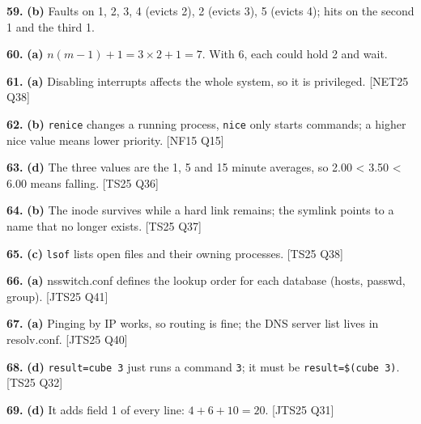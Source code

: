 \documentclass[11pt,a4paper]{article}
\begin{document}
\noindent\textbf{59.} \textbf{(b)} Faults on 1, 2, 3, 4 (evicts 2), 2 (evicts 3), 5 (evicts 4); hits on the second 1 and the third 1.\par\vspace{3pt}
\noindent\textbf{60.} \textbf{(a)} $n(m-1)+1=3\times2+1=7$. With 6, each could hold 2 and wait.\par\vspace{3pt}
\noindent\textbf{61.} \textbf{(a)} Disabling interrupts affects the whole system, so it is privileged. {\color{ember}\scriptsize[NET25 Q38]}\par\vspace{3pt}
\noindent\textbf{62.} \textbf{(b)} \texttt{renice} changes a running process, \texttt{nice} only starts commands; a higher nice value means lower priority. {\color{ember}\scriptsize[NF15 Q15]}\par\vspace{3pt}
\noindent\textbf{63.} \textbf{(d)} The three values are the 1, 5 and 15 minute averages, so 2.00 < 3.50 < 6.00 means falling. {\color{ember}\scriptsize[TS25 Q36]}\par\vspace{3pt}
\noindent\textbf{64.} \textbf{(b)} The inode survives while a hard link remains; the symlink points to a name that no longer exists. {\color{ember}\scriptsize[TS25 Q37]}\par\vspace{3pt}
\noindent\textbf{65.} \textbf{(c)} \texttt{lsof} lists open files and their owning processes. {\color{ember}\scriptsize[TS25 Q38]}\par\vspace{3pt}
\noindent\textbf{66.} \textbf{(a)} nsswitch.conf defines the lookup order for each database (hosts, passwd, group). {\color{ember}\scriptsize[JTS25 Q41]}\par\vspace{3pt}
\noindent\textbf{67.} \textbf{(a)} Pinging by IP works, so routing is fine; the DNS server list lives in resolv.conf. {\color{ember}\scriptsize[JTS25 Q40]}\par\vspace{3pt}
\noindent\textbf{68.} \textbf{(d)} \texttt{result=cube 3} just runs a command \texttt{3}; it must be \texttt{result=\$(cube 3)}. {\color{ember}\scriptsize[TS25 Q32]}\par\vspace{3pt}
\noindent\textbf{69.} \textbf{(d)} It adds field 1 of every line: $4+6+10=20$. {\color{ember}\scriptsize[JTS25 Q31]}\par\vspace{3pt}
\end{document}
